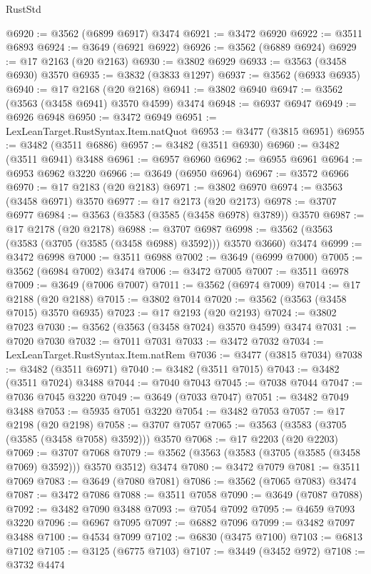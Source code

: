 \begin{lexlean}{RustStd}
\begin{coremodule}
{\begin{coremodule}
{{{{{{{{{{{{{{{{{{{{{{{{{{{{{{{{{{{{{{{{{{{{{@6920 := @3562 (@6899 @6917) @3474
@6921 := @3472 @6920
@6922 := @3511 @6893
@6924 := @3649 (@6921 @6922)
@6926 := @3562 (@6889 @6924)
@6929 := @17 @2163 (@20 @2163)
@6930 := @3802 @6929
@6933 := @3563 (@3458 @6930) @3570
@6935 := @3832 (@3833 @1297)
@6937 := @3562 (@6933 @6935)
@6940 := @17 @2168 (@20 @2168)
@6941 := @3802 @6940
@6947 := @3562 (@3563 (@3458 @6941) @3570 @4599) @3474
@6948 := @6937 @6947
@6949 := @6926 @6948
@6950 := @3472 @6949
@6951 := LexLeanTarget.RustSyntax.Item.natQuot
@6953 := @3477 (@3815 @6951)
@6955 := @3482 (@3511 @6886)
@6957 := @3482 (@3511 @6930)
@6960 := @3482 (@3511 @6941) @3488
@6961 := @6957 @6960
@6962 := @6955 @6961
@6964 := @6953 @6962 @3220
@6966 := @3649 (@6950 @6964)
@6967 := @3572 @6966
@6970 := @17 @2183 (@20 @2183)
@6971 := @3802 @6970
@6974 := @3563 (@3458 @6971) @3570
@6977 := @17 @2173 (@20 @2173)
@6978 := @3707 @6977
@6984 := @3563 (@3583 (@3585 (@3458 @6978) @3789)) @3570
@6987 := @17 @2178 (@20 @2178)
@6988 := @3707 @6987
@6998 := @3562 (@3563 (@3583 (@3705 (@3585 (@3458 @6988) @3592))) @3570 @3660) @3474
@6999 := @3472 @6998
@7000 := @3511 @6988
@7002 := @3649 (@6999 @7000)
@7005 := @3562 (@6984 @7002) @3474
@7006 := @3472 @7005
@7007 := @3511 @6978
@7009 := @3649 (@7006 @7007)
@7011 := @3562 (@6974 @7009)
@7014 := @17 @2188 (@20 @2188)
@7015 := @3802 @7014
@7020 := @3562 (@3563 (@3458 @7015) @3570 @6935)
@7023 := @17 @2193 (@20 @2193)
@7024 := @3802 @7023
@7030 := @3562 (@3563 (@3458 @7024) @3570 @4599) @3474
@7031 := @7020 @7030
@7032 := @7011 @7031
@7033 := @3472 @7032
@7034 := LexLeanTarget.RustSyntax.Item.natRem
@7036 := @3477 (@3815 @7034)
@7038 := @3482 (@3511 @6971)
@7040 := @3482 (@3511 @7015)
@7043 := @3482 (@3511 @7024) @3488
@7044 := @7040 @7043
@7045 := @7038 @7044
@7047 := @7036 @7045 @3220
@7049 := @3649 (@7033 @7047)
@7051 := @3482 @7049 @3488
@7053 := @5935 @7051 @3220
@7054 := @3482 @7053
@7057 := @17 @2198 (@20 @2198)
@7058 := @3707 @7057
@7065 := @3563 (@3583 (@3705 (@3585 (@3458 @7058) @3592))) @3570
@7068 := @17 @2203 (@20 @2203)
@7069 := @3707 @7068
@7079 := @3562 (@3563 (@3583 (@3705 (@3585 (@3458 @7069) @3592))) @3570 @3512) @3474
@7080 := @3472 @7079
@7081 := @3511 @7069
@7083 := @3649 (@7080 @7081)
@7086 := @3562 (@7065 @7083) @3474
@7087 := @3472 @7086
@7088 := @3511 @7058
@7090 := @3649 (@7087 @7088)
@7092 := @3482 @7090 @3488
@7093 := @7054 @7092
@7095 := @4659 @7093 @3220
@7096 := @6967 @7095
@7097 := @6882 @7096
@7099 := @3482 @7097 @3488
@7100 := @4534 @7099
@7102 := @6830 (@3475 @7100)
@7103 := @6813 @7102
@7105 := @3125 (@6775 @7103)
@7107 := @3449 (@3452 @972)
@7108 := @3732 @4474
}}}}}}}}}}}}}}}}}}}}}}}}}}}}}}}}}}}}}}}}}}}}}
\end{coremodule}}
\end{coremodule}
\end{lexlean}
